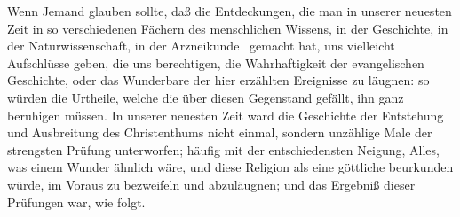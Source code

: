 Wenn Jemand glauben sollte, daß die Entdeckungen, die man in unserer neuesten Zeit in so verschiedenen Fächern des menschlichen Wissens, in der Geschichte, in der Naturwissenschaft, in der Arzneikunde \usw\ gemacht hat, uns vielleicht Aufschlüsse geben, die uns berechtigen, die Wahrhaftigkeit der evangelischen Geschichte, oder das Wunderbare der hier erzählten Ereignisse zu läugnen: so würden die Urtheile, welche die  über diesen Gegenstand gefällt, ihn ganz beruhigen müssen. In unserer neuesten Zeit ward die Geschichte der Entstehung und Ausbreitung des Christenthums nicht einmal, sondern unzählige Male der strengsten Prüfung unterworfen; häufig mit der entschiedensten Neigung, Alles, was einem Wunder ähnlich wäre, und diese Religion als eine göttliche beurkunden würde, im Voraus zu bezweifeln und abzuläugnen; und das Ergebniß dieser Prüfungen war, wie folgt.
